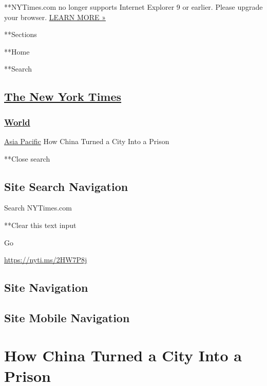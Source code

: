  **NYTimes.com no longer supports Internet Explorer 9 or earlier. Please
upgrade your browser.
\href{http://www.nytimes3xbfgragh.onion/content/help/site/ie9-support.html}{LEARN
MORE »}

**Sections

**Home

**Search

\hypertarget{the-new-york-times}{%
\subsection{\texorpdfstring{\href{http://www.nytimes3xbfgragh.onion/}{The
New York Times}}{The New York Times}}\label{the-new-york-times}}

\hypertarget{-world-}{%
\subsubsection{\texorpdfstring{ \href{/section/world}{World}
}{ World }}\label{-world-}}

 \href{/section/world/asia}{Asia Pacific} \textbar{}How China Turned a
City Into a Prison

**Close search

\hypertarget{site-search-navigation}{%
\subsection{Site Search Navigation}\label{site-search-navigation}}

Search NYTimes.com

**Clear this text input

Go

\url{https://nyti.ms/2HW7P8j}

\hypertarget{site-navigation}{%
\subsection{Site Navigation}\label{site-navigation}}

\hypertarget{site-mobile-navigation}{%
\subsection{Site Mobile Navigation}\label{site-mobile-navigation}}

\hypertarget{how-china-turned-a-city-into-a-prison}{%
\section{How China Turned a City Into a
Prison}\label{how-china-turned-a-city-into-a-prison}}


